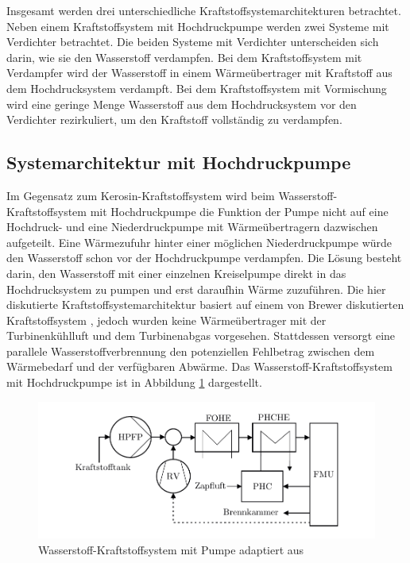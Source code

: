 Insgesamt werden drei unterschiedliche Kraftstoffsystemarchitekturen betrachtet. Neben einem Kraftstoffsystem mit Hochdruckpumpe werden zwei Systeme mit Verdichter betrachtet. Die beiden Systeme mit Verdichter unterscheiden sich darin, wie sie den Wasserstoff verdampfen. Bei dem Kraftstoffsystem mit Verdampfer wird der Wasserstoff in einem Wärmeübertrager mit Kraftstoff aus dem Hochdrucksystem verdampft. Bei dem Kraftstoffsystem mit Vormischung wird eine geringe Menge Wasserstoff aus dem Hochdrucksystem vor den Verdichter rezirkuliert, um den Kraftstoff vollständig zu verdampfen.

\subsection{Systemarchitektur mit Hochdruckpumpe}

Im Gegensatz zum Kerosin-Kraftstoffsystem wird beim Wasserstoff-Kraftstoffsystem mit Hochdruckpumpe die Funktion der Pumpe nicht auf eine Hochdruck- und eine Niederdruckpumpe mit Wärmeübertragern dazwischen aufgeteilt. Eine Wärmezufuhr hinter einer möglichen Niederdruckpumpe würde den Wasserstoff schon vor der Hochdruckpumpe verdampfen. Die Lösung besteht darin, den Wasserstoff mit einer einzelnen Kreiselpumpe direkt in das Hochdrucksystem zu pumpen und erst daraufhin Wärme zuzuführen. Die hier diskutierte Kraftstoffsystemarchitektur basiert auf einem von Brewer diskutierten Kraftstoffsystem \cite{Brewer.1991}, jedoch wurden keine Wärmeübertrager mit der Turbinenkühlluft und dem Turbinenabgas vorgesehen. Stattdessen versorgt eine parallele Wasserstoffverbrennung den potenziellen Fehlbetrag zwischen dem Wärmebedarf und der verfügbaren Abwärme. Das Wasserstoff-Kraftstoffsystem mit Hochdruckpumpe ist in  Abbildung \ref{fig:pumpe} dargestellt.

\begin{figure}[ht]
\centering
\includegraphics[width=1\linewidth]{4_Abbildungen/2_Hauptteil/Kraftstoffsystem Abbildungen/pump.pdf}
  \caption{Wasserstoff-Kraftstoffsystem mit Pumpe adaptiert aus \cite{Brewer.1991}}
  \label{fig:pumpe}
\end{figure}
\FloatBarrier 


